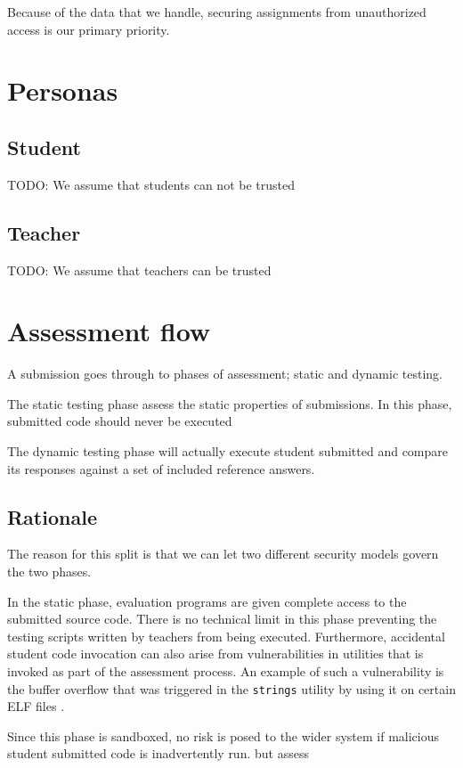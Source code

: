 Because of the data that we handle, securing assignments from
unauthorized access is our primary priority.

\section{Personas}
\subsection{Student}
TODO: We assume that students can not be trusted

\subsection{Teacher}
TODO: We assume that teachers can be trusted

\section{Assessment flow}
A submission goes through to phases of assessment; static and dynamic
testing.

The static testing phase assess the static properties of
submissions. In this phase, submitted code should never be executed

The dynamic testing phase will actually execute student submitted and
compare its responses against a set of included reference answers.

\subsection{Rationale}
The reason for this split is that we can let two different security
models govern the two phases.

In the static phase, evaluation programs are given complete access to
the submitted source code. There is no technical limit in this phase
preventing the testing scripts written by teachers from being
executed. Furthermore, accidental student code invocation can also
arise from vulnerabilities in utilities that is invoked as part of the
assessment process. An example of such a vulnerability is the buffer
overflow that was triggered in the \texttt{strings} utility by using
it on certain ELF files \cite{stringsvuln}. 

Since this phase is sandboxed, no risk is posed to the wider system if
malicious student submitted code is inadvertently run. but assess

